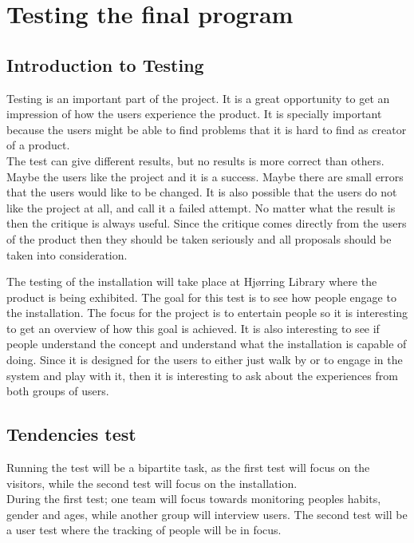 \chapter{Testing the final program}
\section{Introduction to Testing}
Testing is an important part of the project. It is a great opportunity to get an impression of how the users experience the product. It is specially important because the users might be able to find problems that it is hard to find as creator of a product. \\
The test can give different results, but no results is more correct than others. Maybe the users like the project and it is a success. Maybe there are small errors that the users would like to be changed. It is also possible that the users do not like the project at all, and call it a failed attempt. No matter what the result is then the critique is always useful. Since the critique comes directly from the users of the product then they should be taken seriously and all proposals should be taken into consideration. 

The testing of the installation will take place at Hj{\o}rring Library where the product is being exhibited. The goal for this test is to see how people engage to the installation. The focus for the project is to entertain people so it is interesting to get an overview of how this goal is achieved. It is also interesting to see if people understand the concept and understand what the installation is capable of doing. Since it is designed for the users to either just walk by or to engage in the system and play with it, then it is interesting to ask about the experiences from both groups of users. \\ 

\section{Tendencies test}
Running the test will be a bipartite task, as the first test will focus on the visitors, while the second test will focus on the installation.\\
During the first test; one team will focus towards monitoring peoples habits, gender and ages, while another group will interview users. The second test will be a user test where the tracking of people will be in focus.

